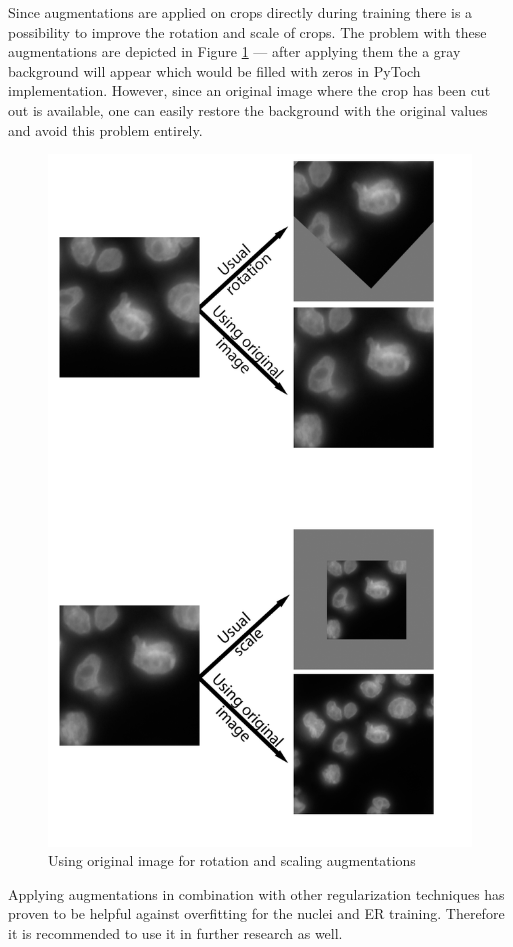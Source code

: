 Since augmentations are applied on crops directly during training there is a possibility to improve the rotation and scale of crops. The problem with these augmentations are depicted in Figure \ref{fig:smart-augments} --- after applying them the a gray background will appear which would be filled with zeros in PyToch implementation. However, since an original image where the crop has been cut out is available, one can easily restore the background with the original values and avoid this problem entirely.

\begin{figure}[H]
	\begin{center}
		\includegraphics[width=0.7\linewidth]{bilder/model training/smart augmentations.png}
		\caption{Using original image for rotation and scaling augmentations}\label{fig:smart-augments}
	\end{center}
\end{figure}

Applying augmentations in combination with other regularization techniques has proven to be helpful against overfitting for the nuclei and ER training. Therefore it is recommended to use it in further research as well.

